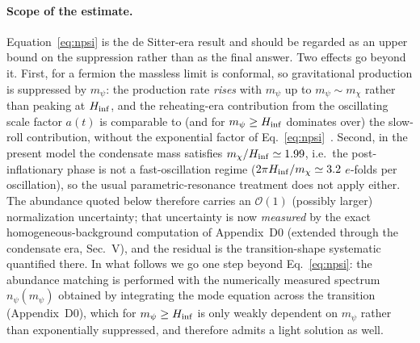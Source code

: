 \documentclass[pdflatex,sn-mathphys-num]{sn-jnl}
\providecommand{\gtrsim}{\geq}
\theoremstyle{thmstyleone}
\begin{document}
\paragraph{Scope of the estimate.} Equation~\eqref{eq:npsi} is the de Sitter-era result and should be regarded as an upper bound on the suppression rather than as the final answer. Two effects go beyond it. First, for a fermion the massless limit is conformal, so gravitational production is suppressed by $m_\psi$: the production rate \emph{rises} with $m_\psi$ up to $m_\psi\sim m_\chi$ rather than peaking at $H_{\rm inf}$, and the reheating-era contribution from the oscillating scale factor $a(t)$ is comparable to (and for $m_\psi\gtrsim H_{\rm inf}$ dominates over) the slow-roll contribution, without the exponential factor of Eq.~\eqref{eq:npsi}~\cite{ChungKolbLong2019,EmaNakayamaTang2019}. Second, in the present model the condensate mass satisfies $m_\chi/H_{\rm inf}\simeq1.99$, i.e.\ the post-inflationary phase is not a fast-oscillation regime ($2\pi H_{\rm inf}/m_\chi\simeq3.2$ $e$-folds per oscillation), so the usual parametric-resonance treatment does not apply either. The abundance quoted below therefore carries an $\mathcal{O}(1)$ (possibly larger) normalization uncertainty; that uncertainty is now \emph{measured} by the exact homogeneous-background computation of Appendix~D0 (extended through the condensate era, Sec.~V), and the residual is the transition-shape systematic quantified there. In what follows we go one step beyond Eq.~\eqref{eq:npsi}: the abundance matching is performed with the numerically measured spectrum $n_\psi(m_\psi)$ obtained by integrating the mode equation across the transition (Appendix~D0), which for $m_\psi\gtrsim H_{\rm inf}$ is only weakly dependent on $m_\psi$ rather than exponentially suppressed, and therefore admits a light solution as well.
\end{document}
